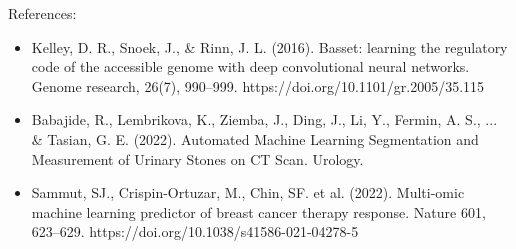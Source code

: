 \documentclass{article}
\begin{document}
References:
\begin{itemize}
    \item Kelley, D. R., Snoek, J., \& Rinn, J. L. (2016). Basset: learning the regulatory code of the accessible genome with deep convolutional neural networks. Genome research, 26(7), 990–999. https://doi.org/10.1101/gr.2005/35.115
    \item Babajide, R., Lembrikova, K., Ziemba, J., Ding, J., Li, Y., Fermin, A. S., ... \& Tasian, G. E. (2022). Automated Machine Learning Segmentation and Measurement of Urinary Stones on CT Scan. Urology.
    \item Sammut, SJ., Crispin-Ortuzar, M., Chin, SF. et al.  (2022). Multi-omic machine learning predictor of breast cancer therapy response. Nature 601, 623–629. https://doi.org/10.1038/s41586-021-04278-5
\end{itemize}
\end{document}
